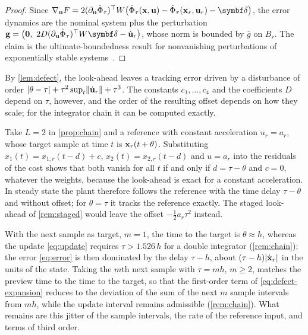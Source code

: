 \begin{proof}
Since $\nabla_{\bu}F = 2(\partial_{\bu}\hat\Phi_\tau)^\T W\bigl(\hat\Phi_\tau(\bx,\bu) -
\hat\Phi_\tau(\bx_r,\bu_r) - \bdelta\bigr)$, the error dynamics are the nominal system plus the
perturbation
$\mathbf{g} = \bigl(\mathbf{0},\ 2D(\partial_{\bu}\hat\Phi_\tau)^\T W\bdelta - \dot\bu_r\bigr)$,
whose norm is bounded by $\bar g$ on $B_r$.
The claim is the ultimate-boundedness result for nonvanishing perturbations of exponentially stable
systems~\citep[Sect.~9.2]{khalil2002nonlinear}.
\end{proof}

By \cref{lem:defect}, the look-ahead leaves a tracking error driven by a disturbance of order
$\lvert\theta - \tau\rvert + \tau^2\sup_t\lVert\dot{\mathbf{u}}_r\rVert + \tau^3$.
The constants $c_1,\dots,c_4$ and the coefficients $D$ depend on $\tau$, however, and the order of the
resulting offset depends on how they scale; for the integrator chain it can be computed exactly.

\begin{example}\label{ex:offset}
Take $L = 2$ in \cref{prop:chain} and a reference with constant acceleration $u_r = a_r$, whose
target sample at time $t$ is $\mathbf{x}_r(t+\theta)$.
Substituting $x_1(t) = x_{1,r}(t - d) + c$, $x_2(t) = x_{2,r}(t - d)$ and $u = a_r$ into the
residuals of the cost shows that both vanish for all $t$ if and only if $d = \tau - \theta$ and
$c = 0$, whatever the weights, because the look-ahead is exact for a constant acceleration.
In steady state the plant therefore follows the reference with the time delay $\tau - \theta$ and
without offset; for $\theta = \tau$ it tracks the reference exactly.
The staged look-ahead of \cref{rem:staged} would leave the offset $-\frac12 a_r\tau^2$ instead.
\end{example}

\begin{remark}\label{rem:target}
With the next sample as target, $m = 1$, the time to the target is $\theta \approx h$, whereas the
update \eqref{eq:update} requires $\tau > 1.526\,h$ for a double integrator (\cref{rem:chain}); the
error \eqref{eq:error} is then dominated by the delay $\tau - h$, about $(\tau - h)\lvert\dot{\mathbf{x}}_r\rvert$ in
the units of the state.
Taking the $m$th next sample with $\tau = mh$, $m \ge 2$, matches the preview time to the time to the
target, so that the first-order term of \eqref{eq:defect-expansion} reduces to the deviation of the
sum of the next $m$ sample intervals from $mh$, while the update interval remains admissible
(\cref{rem:chain}).
What remains are this jitter of the sample intervals, the rate of the reference input, and terms of
third order.
\end{remark}

